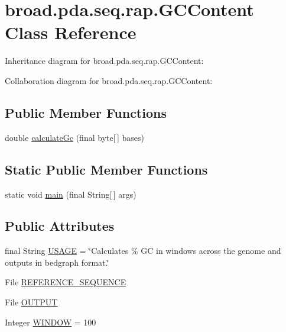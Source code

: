 \hypertarget{classbroad_1_1pda_1_1seq_1_1rap_1_1_g_c_content}{\section{broad.\+pda.\+seq.\+rap.\+G\+C\+Content Class Reference}
\label{classbroad_1_1pda_1_1seq_1_1rap_1_1_g_c_content}
}


Inheritance diagram for broad.\+pda.\+seq.\+rap.\+G\+C\+Content\+:


Collaboration diagram for broad.\+pda.\+seq.\+rap.\+G\+C\+Content\+:
\subsection*{Public Member Functions}
\begin{DoxyCompactItemize}
\item 
double \hyperlink{classbroad_1_1pda_1_1seq_1_1rap_1_1_g_c_content_a2cdf64da9c909c928da3470d7bcb1ce2}{calculate\+Gc} (final byte\mbox{[}$\,$\mbox{]} bases)
\end{DoxyCompactItemize}
\subsection*{Static Public Member Functions}
\begin{DoxyCompactItemize}
\item 
static void \hyperlink{classbroad_1_1pda_1_1seq_1_1rap_1_1_g_c_content_ad89e50f9e92d9bca5a593f6b5dd28bf8}{main} (final String\mbox{[}$\,$\mbox{]} args)
\end{DoxyCompactItemize}
\subsection*{Public Attributes}
\begin{DoxyCompactItemize}
\item 
final String \hyperlink{classbroad_1_1pda_1_1seq_1_1rap_1_1_g_c_content_abaf01f1889afaf59bf53d7464aefeaf6}{U\+S\+A\+G\+E} = \char`\"{}Calculates \% G\+C in windows across the genome and outputs in bedgraph format.\char`\"{}
\item 
File \hyperlink{classbroad_1_1pda_1_1seq_1_1rap_1_1_g_c_content_ac9a87e5ebdfe61daa2ac134293a3648d}{R\+E\+F\+E\+R\+E\+N\+C\+E\+\_\+\+S\+E\+Q\+U\+E\+N\+C\+E}
\item 
File \hyperlink{classbroad_1_1pda_1_1seq_1_1rap_1_1_g_c_content_a4f2fa778848b23c841208c57e679ec8b}{O\+U\+T\+P\+U\+T}
\item 
Integer \hyperlink{classbroad_1_1pda_1_1seq_1_1rap_1_1_g_c_content_a4b0d167d7940ab79dbc90ed0dc6741b1}{W\+I\+N\+D\+O\+W} = 100
\end{DoxyCompactItemize}
